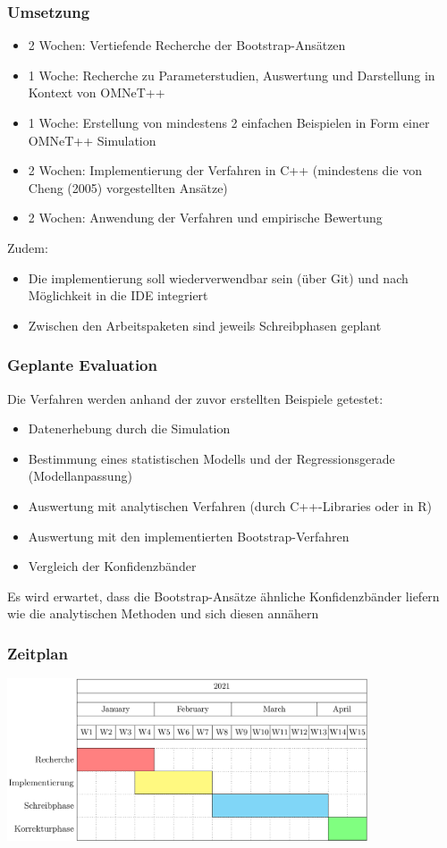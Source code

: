 \documentclass[aspectratio=1610, 9pt]{beamer}
\begin{document}
\begin{frame}
  \frametitle{Umsetzung}
  \begin{itemize}
    \item 2 Wochen: Vertiefende Recherche der Bootstrap-Ansätzen 
    \item 1 Woche: Recherche zu Parameterstudien, Auswertung und Darstellung in Kontext von OMNeT++
    \item 1 Woche: Erstellung von mindestens 2 einfachen Beispielen in Form einer OMNeT++ Simulation
    \item 2 Wochen: Implementierung der Verfahren in C++ (mindestens die von Cheng (2005) vorgestellten Ansätze)
    \item 2 Wochen: Anwendung der Verfahren und empirische Bewertung
  \end{itemize}
  Zudem:
  \begin{itemize}
    \item Die implementierung soll wiederverwendbar sein (über Git) und nach Möglichkeit in die IDE integriert
    \item Zwischen den Arbeitspaketen sind jeweils Schreibphasen geplant
  \end{itemize}
\end{frame}

\begin{frame}
  \frametitle{Geplante Evaluation}
  Die Verfahren werden anhand der zuvor erstellten Beispiele getestet:
  \begin{itemize}
    \item Datenerhebung durch die Simulation 
    \item Bestimmung eines statistischen Modells und der Regressionsgerade (Modellanpassung)
    \item Auswertung mit analytischen Verfahren (durch C++-Libraries oder in R)
    \item Auswertung mit den implementierten Bootstrap-Verfahren
    \item Vergleich der Konfidenzbänder
  \end{itemize}
  Es wird erwartet, dass die Bootstrap-Ansätze ähnliche Konfidenzbänder liefern wie die analytischen Methoden und sich diesen annähern
\end{frame}

\begin{frame}
  \frametitle{Zeitplan}
  \begin{center}
    \includegraphics[width=0.8\textwidth]{images/2.png}
  \end{center}
\end{frame}
\end{document}
